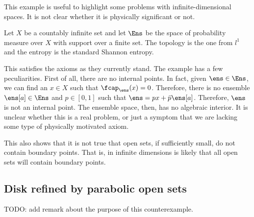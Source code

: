 This example is useful to highlight some problems with infinite-dimensional spaces. It is not clear whether it is physically significant or not.

\begin{example}
	Let $X$ be a countably infinite set and let $\Ens$ be the space of probability measure over $X$ with support over a finite set. The topology is the one from $l^1$ and the entropy is the standard Shannon entropy.
\end{example}

This satisfies the axioms as they currently stand. The example has a few peculiarities. First of all, there are no internal points. In fact, given $\ens \in \Ens$, we can find an $x \in X$ such that $\fcap_{\ens}(x) = 0$. Therefore, there is no ensemble $\ens[a] \in \Ens$ and $p \in [0,1]$ such that $\ens = p x + \bar{p} \ens[a]$. Therefore, $\ens$ is not an internal point. The ensemble space, then, has no algebraic interior. It is unclear whether this is a real problem, or just a symptom that we are lacking some type of physically motivated axiom.

This also shows that it is not true that open sets, if sufficiently small, do not contain boundary points. That is, in infinite dimensions is likely that all open sets will contain boundary points.

\subsection{Disk refined by parabolic open sets}

TODO: add remark about the purpose of this counterexample.

